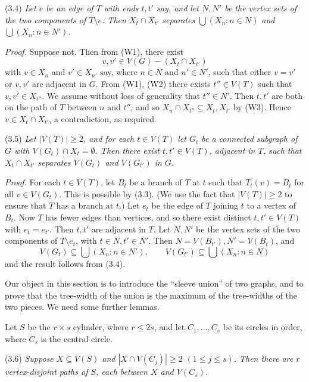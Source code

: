 \stmt
(3.4) \textit{Let $e$ be an edge of $T$ with ends $t, t'$ say, and let $N, N'$ be the vertex sets of the two components of $T \setminus e$. Then $X_t \cap X_{t'}$ separates $\bigcup(X_n : n \in N)$ and $\bigcup(X_n : n \in N')$.}

\textit{Proof.} Suppose not. Then from (W1), there exist
\begin{equation*}
v, v' \in V(G) - (X_t \cap X_{t'})
\end{equation*}
with $v \in X_n$ and $v' \in X_{n'}$ say, where $n \in N$ and $n' \in N'$, such that either $v = v'$ or $v, v'$ are adjacent in $G$. From (W1), (W2) there exists $t'' \in V(T)$ such that $v, v' \in X_{t''}$. We assume without loss of generality that $t'' \in N'$. Then $t, t'$ are both on the path of $T$ between $n$ and $t''$, and so $X_n \cap X_{t''} \subseteq X_t, X_{t'}$ by (W3). Hence $v \in X_t \cap X_{t'}$, a contradiction, as required.

\stmt
(3.5) \textit{Let $|V(T)| \ge 2$, and for each $t \in V(T)$ let $G_t$ be a connected subgraph of $G$ with $V(G_t) \cap X_t = \emptyset$. Then there exist $t, t' \in V(T)$, adjacent in $T$, such that $X_t \cap X_{t'}$ separates $V(G_t)$ and $V(G_{t'})$ in $G$.}

\textit{Proof.} For each $t \in V(T)$, let $B_t$ be a branch of $T$ at $t$ such that $T_t(v) = B_t$ for all $v \in V(G_t)$. This is possible by (3.3). (We use the fact that $|V(T)| \ge 2$ to ensure that $T$ has a branch at $t$.) Let $e_t$ be the edge of $T$ joining $t$ to a vertex of $B_t$. Now $T$ has fewer edges than vertices, and so there exist distinct $t, t' \in V(T)$ with $e_t = e_{t'}$. Then $t, t'$ are adjacent in $T$. Let $N, N'$ be the vertex sets of the two components of $T \setminus e_t$, with $t \in N, t' \in N'$. Then $N = V(B_{t'}), N' = V(B_t)$, and
\begin{equation*}
V(G_t) \subseteq \bigcup(X_n : n \in N'), \qquad V(G_{t'}) \subseteq \bigcup(X_n : n \in N)
\end{equation*}
and the result follows from (3.4).

Our object in this section is to introduce the ``sleeve union'' of two graphs, and to prove that the tree-width of the union is the maximum of the tree-widths of the two pieces. We need some further lemmas.

Let $S$ be the $r \times s$ cylinder, where $r \le 2s$, and let $C_1, \dots, C_s$ be its circles in order, where $C_s$ is the central circle.

\stmt
(3.6) \textit{Suppose $X \subseteq V(S)$ and $|X \cap V(C_j)| \ge 2$ $(1 \le j \le s)$. Then there are $r$ vertex-disjoint paths of $S$, each between $X$ and $V(C_s)$.}

